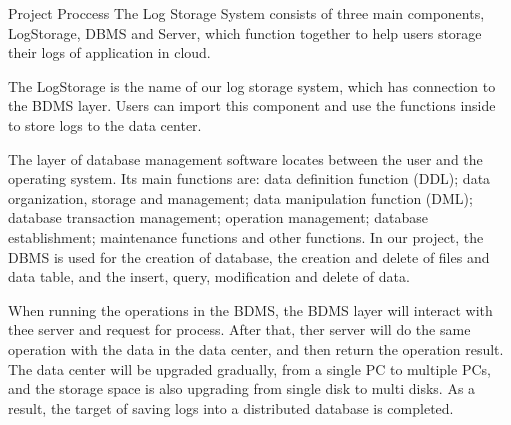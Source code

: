 \documentclass[UTF8, 11pt, twocolumn]{ctexart}
\makeatletter
\renewcommand{\section}{\@startsection{section}{1}{0mm}
  {0.5\baselineskip}{0.5\baselineskip}{\bf\leftline}}
\makeatother
\begin{document}
    \section{Project Proccess}
        The Log Storage System consists of three main components, LogStorage, DBMS and Server, which function together to help users storage their logs of 
        application in cloud.\par
        The LogStorage is the name of our log storage system, which has connection to the BDMS layer. Users can import this component and use the functions 
        inside to store logs to the data center.\par
        The layer of database management software locates between the user and the operating system. Its main functions are: 
        data definition function (DDL); data organization, storage and management; data manipulation function (DML); database transaction management; 
        operation management; database establishment; maintenance functions and other functions. In our project, the DBMS is used for the creation of database,
        the creation and delete of files and data table, and the insert, query, modification and delete of data.\par
        When running the operations in the BDMS, the BDMS layer will interact with thee server and request for process. After that, ther server will do the same
        operation with the data in the data center, and then return the operation result. The data center will be upgraded gradually, from a single PC to 
        multiple PCs, and the storage space is also upgrading from single disk to multi disks. As a result, the target of saving logs into a distributed database 
        is completed.\par
\end{document}
